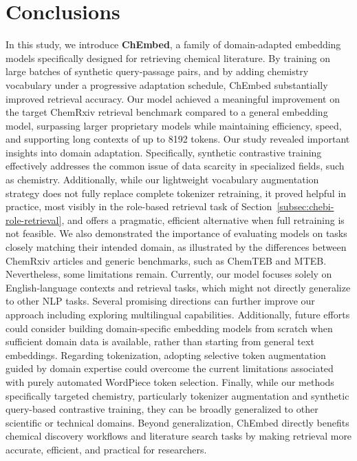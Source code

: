\documentclass[twoside,twocolumn,9pt]{article}
\begin{document}
\section*{Conclusions}
In this study, we introduce \textbf{ChEmbed}, a family of domain-adapted embedding models specifically designed for retrieving chemical literature. By training on large batches of synthetic query-passage pairs, and by adding chemistry vocabulary under a progressive adaptation schedule, {ChEmbed} substantially improved retrieval accuracy. Our model achieved a meaningful improvement on the target ChemRxiv retrieval benchmark compared to a general embedding model, surpassing larger proprietary models while maintaining efficiency, speed, and supporting long contexts of up to 8192 tokens. Our study revealed important insights into domain adaptation. Specifically, synthetic contrastive training effectively addresses the common issue of data scarcity in specialized fields, such as chemistry. Additionally, while our lightweight vocabulary augmentation strategy does not fully replace complete tokenizer retraining, it proved helpful in practice, most visibly in the role-based retrieval task of Section~\ref{subsec:chebi-role-retrieval}, and offers a pragmatic, efficient alternative when full retraining is not feasible. We also demonstrated the importance of evaluating models on tasks closely matching their intended domain, as illustrated by the differences between ChemRxiv articles and generic benchmarks, such as ChemTEB and MTEB. Nevertheless, some limitations remain. Currently, our model focuses solely on English-language contexts and retrieval tasks, which might not directly generalize to other NLP tasks. Several promising directions can further improve our approach including exploring multilingual capabilities.
Additionally, future efforts could consider building domain-specific embedding models from scratch when sufficient domain data is available, rather than starting from general text embeddings. Regarding tokenization, adopting selective token augmentation guided by domain expertise could overcome the current limitations associated with purely automated WordPiece token selection. Finally, while our methods specifically targeted chemistry, particularly tokenizer augmentation and synthetic query-based contrastive training, they can be broadly generalized to other scientific or technical domains. Beyond generalization, {ChEmbed} directly benefits chemical discovery workflows and literature search tasks by making retrieval more accurate, efficient, and practical for researchers.
\end{document}
